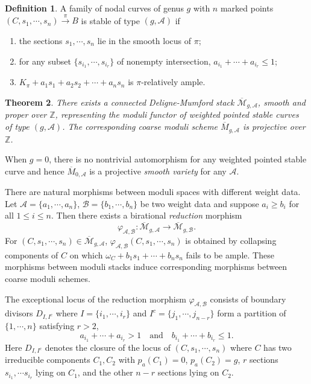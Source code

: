\documentclass[10pt]{amsart}
\newtheorem{theorem}{Theorem}[section]
\theoremstyle{definition}
\newtheorem{definition}[theorem]{Definition}
\newcommand{\ZZ}{\mathbb{Z}}
\newcommand{\cA}{\mathcal{A} }
\begin{document}
\begin{definition}\cite[\S 2]{Hassett}
A family of nodal curves of genus $g$ with $n$ marked points $(C,
s_1, \cdots, s_n) \stackrel{\pi}{\to} B$ is stable of type $(g,
\mathcal{A})$ if
\begin{enumerate}
\item the sections $s_1, \cdots, s_n$ lie in the smooth locus of $\pi$;
\item for any subset
$\{s_{i_1}, \cdots, s_{i_r}\}$ of nonempty intersection, $a_{i_1}
+ \cdots + a_{i_r} \le 1$;
\item  $K_{\pi} + a_1s_1 + a_2s_2+\cdots+a_ns_n$ is $\pi$-relatively ample.
\end{enumerate}
\end{definition}

\begin{theorem}\cite[Theorem 2.1]{Hassett}
There exists a connected Deligne-Mumford stack
$\overline{\mathcal{M}}_{g, \mathcal{A}}$, smooth and proper over
$\ZZ$, representing the moduli functor of weighted pointed stable
curves of type $(g, \mathcal{A})$. The corresponding coarse moduli
scheme $\overline{M}_{g, \mathcal{A}}$ is projective over $\ZZ$.
\end{theorem}

When $g = 0$, there is no nontrivial automorphism for any weighted
pointed stable curve and hence $\overline{M}_{0, \mathcal{A}}$ is
a projective \emph{smooth variety} for any $\cA$.

There are natural morphisms between moduli spaces with different
weight data. Let $\mathcal{A}=\{a_1, \cdots, a_n\}$,
$\mathcal{B}=\{b_1, \cdots, b_n\}$ be two weight data and suppose
$a_i \ge b_i$ for all $1 \le i \le n$. Then there exists a
birational \emph{reduction} morphism
\[
    \varphi_{\mathcal{A}, \mathcal{B}}
    : \overline{\mathcal{M}}_{g, \mathcal{A}} \to
    \overline{\mathcal{M}}_{g, \mathcal{B}}.
\]
For $(C, s_1, \cdots, s_n) \in \overline{\mathcal{M}}_{g,
\mathcal{A}}$, $\varphi_{\mathcal{A}, \mathcal{B}}(C, s_1, \cdots,
s_n)$ is obtained by collapsing components of $C$ on which
$\omega_C + b_1s_1+ \cdots + b_ns_n$ fails to be ample. These
morphisms between moduli stacks induce corresponding morphisms
between coarse moduli schemes.

The exceptional locus of the reduction morphism
$\varphi_{\mathcal{A}, \mathcal{B}}$ consists of boundary divisors
$D_{I, I^c}$ where $I = \{i_1, \cdots, i_r\}$ and $I^c=\{j_1,
\cdots, j_{n-r}\}$ form a partition of $\{1, \cdots, n\}$
satisfying $r > 2$, $$a_{i_1} + \cdots + a_{i_r} > 1 \quad
\text{and}\quad b_{i_1} + \cdots + b_{i_r} \le 1.$$ Here $D_{I,
I^c}$ denotes the closure of the locus of $(C, s_1, \cdots, s_n)$
where $C$ has two irreducible components $C_1, C_2$ with $p_a(C_1)
= 0$, $p_a(C_2) = g$, $r$ sections $s_{i_1}, \cdots s_{i_r}$ lying
on $C_1$, and the other $n-r$ sections lying on $C_2$.
\end{document}
